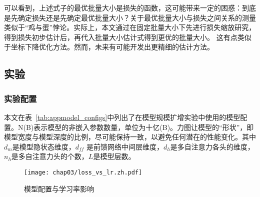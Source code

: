 可以看到，上述式子的最优批量大小是损失的函数，这可能带来一定的困惑：到底是先确定损失还是先确定最优批量大小？关于最优批量大小与损失之间关系的测量类似于“鸡与蛋”悖论。实际上，本文通过在固定批量大小下先进行损失缩放研究，得到损失初步估计后，再代入批量大小估计式得到更优的批量大小。 这有点类似于坐标下降优化方法。然而，未来有可能开发出更精细的估计方法。


\subsection{实验}

\subsubsection{实验配置}
本文在表~\ref{tab:appmodel_configs}中列出了在模型规模扩增实验中使用的模型配置。N(B)表示模型的非嵌入参数数量，单位为十亿(B)。力图让模型的“形状”，即模型宽度与模型深度的比例，尽可能保持一致，以避免任何潜在的性能变化。其中$d_m$是模型隐状态维度，$d_{ff}$ 是前馈网络中间层维度，$d_h$是多自注意力各头的维度，$n_h$是多自注意力头的个数，$L$是模型层数。

\begin{figure}[htbp]
  \centering
  \begin{minipage}{0.42\linewidth}
      \vspace{-6mm}
      \centering
      \label{tab:appmodel_configs}
  \end{minipage}
  \hfill
  \begin{minipage}{0.52\linewidth}
    \vspace{5mm}
      \centering
      \texttt{[image: chap03/loss\_vs\_lr.zh.pdf]}
      \label{fig:loss_vs_lr}
  \end{minipage}
  \caption{模型配置与学习率影响}
\end{figure}


